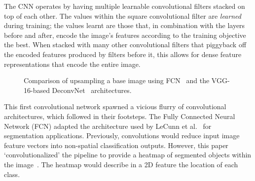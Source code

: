 \documentclass[12pt,twoside]{report}
\begin{document}
The CNN operates by having multiple learnable convolutional filters stacked on top of each other. The values within the square convolutional filter are \textit{learned} during training; the values learnt are those that, in combination with the layers before and after, encode the image's features according to the training objective the best. When stacked with many other convolutional filters that piggyback off the encoded features produced by filters before it, this allows for dense feature representations that encode the entire image.

\begin{figure}
  \centering
  \caption{Comparison of upsampling a base image using FCN~\cite{fully-CNNs-for-semantic-segmentation} and the VGG-16-based DeconvNet~\cite{noh2015learning, simonyan2014very} architectures.}\label{fig:fcn-vs-deconvnet}
\end{figure}

This first convolutional network spawned a vicious flurry of convolutional architectures, which followed in their footsteps. The Fully Connected Neural Network (FCN) adapted the architecture used by LeCunn et al.~\cite{Lenet1998} for segmentation applications. Previously, convolutions would reduce input image feature vectors into non-spatial classification outputs. However, this paper `convolutionalized' the pipeline to provide a heatmap of segmented objects within the image~\cite{fully-CNNs-for-semantic-segmentation}. The heatmap would describe in a 2D feature the location of each class.
\end{document}
